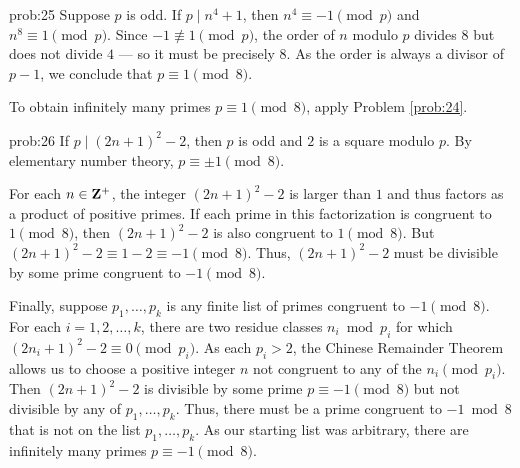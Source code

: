 \begin{sol}{prob:25} Suppose $p$ is odd. If $p\mid n^4+1$, then  $n^4\equiv -1\pmod{p}$ and $n^8 \equiv 1\pmod{p}$. Since $-1\not\equiv 1\pmod{p}$, the order of $n$ modulo $p$ divides $8$ but does not divide $4$ --- so it must be precisely $8$. As the order is always a divisor of $p-1$, we conclude that $p\equiv 1\pmod{8}$. 

To obtain infinitely many primes $p\equiv 1\pmod{8}$, apply Problem \ref{prob:24}.
\end{sol}

\begin{sol}{prob:26} If $p\mid (2n+1)^2-2$, then $p$ is odd and $2$ is a square modulo $p$. By elementary number theory, $p\equiv \pm 1\pmod{8}$. 

For each $n \in \mathbf{Z}^{+}$, the integer $(2n+1)^2-2$ is larger than $1$ and thus factors as a product of positive primes. If each prime in this factorization is congruent to $1\pmod{8}$, then $(2n+1)^2-2$ is also congruent to $1\pmod{8}$. But $(2n+1)^2-2 \equiv 1-2 \equiv -1\pmod{8}$. Thus, $(2n+1)^2-2$ must be divisible by some prime congruent to $-1\pmod{8}$.

Finally, suppose $p_1,\dots,p_k$ is any finite list of primes congruent to $-1\pmod{8}$. For each $i=1,2,\dots,k$, there are two residue classes $n_i \bmod{p_i}$ for which $(2n_i+1)^2-2 \equiv 0 \pmod{p_i}$. As each $p_i > 2$, the Chinese Remainder Theorem allows us to choose a positive integer $n$ not congruent to any of the $n_i \pmod{p_i}$. Then $(2n+1)^2-2$ is divisible by some prime $p\equiv -1\pmod{8}$ but not divisible by any of $p_1,\dots,p_k$. Thus, there must be a prime congruent to $-1\bmod{8}$ that is not on the list $p_1,\dots,p_k$. As our starting list was arbitrary, there are infinitely many primes $p\equiv -1\pmod{8}$.
\end{sol}


